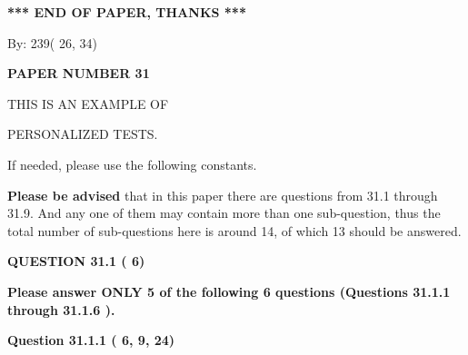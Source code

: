 \documentclass[12pt]{article}
\begin{document}
   
   
   
   
\vspace{1.0in} 
{\textbf{\large{ *** END OF PAPER, THANKS *** }}} 
   
   
\hspace{1.0in} By: 
         239(         26,          34)
   
   
   
   
\newpage 
\setcounter{page}{ 
    31001 } 
   
   
   
   
 {\textbf{ \Large{ PAPER NUMBER          31 }}}
   
   
\vspace{0.2in}
   
   
   
   
   
   
 \vspace{0.2in}
 
 
{\Huge  THIS IS AN EXAMPLE OF}
 
{\Huge  PERSONALIZED TESTS. }
 
If needed, please use the following constants.
 
 
 
{\textbf{\large{Please be advised}}} that in this paper there are questions from
31.1 through
31.9.
And any one of them may contain more than one sub-question, thus the total number
of sub-questions here is around 14, of which
13 should be answered.
 
\vspace{0.3in}
 
 
   
   
  
\vspace{0.2in}
  
{\textbf{\Large{QUESTION
31.1 
 (          6)
}}}
  
  
{\textbf{\Large{Please answer ONLY  %
           5 %
 of the following  %
           6 %
 questions (Questions  %
31.1.1 %
 through  %
31.1.6 %
 ). }}}
   
   
  
\vspace{0.2in}
  
{\textbf{\Large{Question
31.1.1 
 (          6,          9,         24)
}}}
  
  
 
 
\end{document}
